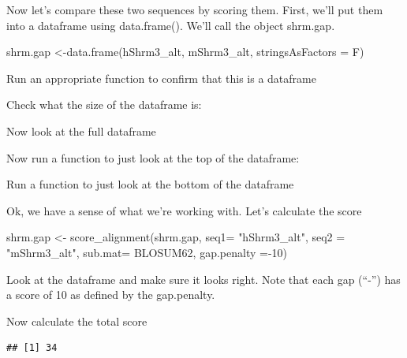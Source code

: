 \documentclass[
]{book}
\newenvironment{Shaded}{\begin{snugshade}}{\end{snugshade}}
\newcommand{\AttributeTok}[1]{\textcolor[rgb]{0.77,0.63,0.00}{#1}}
\newcommand{\DecValTok}[1]{\textcolor[rgb]{0.00,0.00,0.81}{#1}}
\newcommand{\FunctionTok}[1]{\textcolor[rgb]{0.00,0.00,0.00}{#1}}
\newcommand{\NormalTok}[1]{#1}
\newcommand{\OtherTok}[1]{\textcolor[rgb]{0.56,0.35,0.01}{#1}}
\newcommand{\SpecialCharTok}[1]{\textcolor[rgb]{0.00,0.00,0.00}{#1}}
\newcommand{\StringTok}[1]{\textcolor[rgb]{0.31,0.60,0.02}{#1}}
\begin{document}
Now let's compare these two sequences by scoring them. First, we'll put them into a dataframe using data.frame(). We'll call the object shrm.gap.

\begin{Shaded}
\begin{Highlighting}[]
\NormalTok{shrm.gap }\OtherTok{\textless{}{-}}\FunctionTok{data.frame}\NormalTok{(hShrm3\_alt,}
\NormalTok{                      mShrm3\_alt, }
                      \AttributeTok{stringsAsFactors =}\NormalTok{ F)}
\end{Highlighting}
\end{Shaded}

Run an appropriate function to confirm that this is a dataframe

Check what the size of the dataframe is:

Now look at the full dataframe

Now run a function to just look at the top of the dataframe:

Run a function to just look at the bottom of the dataframe

Ok, we have a sense of what we're working with. Let's calculate the score

\begin{Shaded}
\begin{Highlighting}[]
\NormalTok{shrm.gap }\OtherTok{\textless{}{-}} \FunctionTok{score\_alignment}\NormalTok{(shrm.gap, }
                     \AttributeTok{seq1=}  \StringTok{"hShrm3\_alt"}\NormalTok{,}
                     \AttributeTok{seq2 =} \StringTok{"mShrm3\_alt"}\NormalTok{,}
                     \AttributeTok{sub.mat=}\NormalTok{ BLOSUM62,}
                     \AttributeTok{gap.penalty =}\SpecialCharTok{{-}}\DecValTok{10}\NormalTok{)}
\end{Highlighting}
\end{Shaded}

Look at the dataframe and make sure it looks right. Note that each gap (``-'') has a score of 10 as defined by the gap.penalty.

Now calculate the total score

\begin{Shaded}
\end{Shaded}

\begin{verbatim}
## [1] 34
\end{verbatim}
\end{document}
